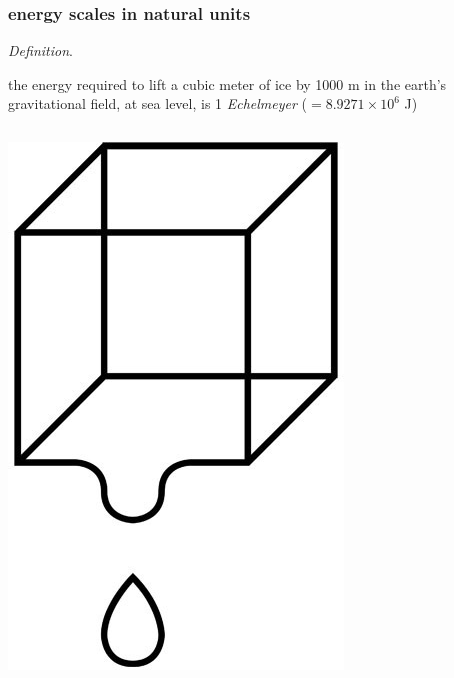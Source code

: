 \documentclass{beamer}
\begin{document}

\begin{frame}
  \frametitle{energy scales in natural units}

\emph{Definition}. 

\quad \begin{minipage}[t]{8cm} the energy required to lift a cubic meter of ice by 1000 m in the earth's gravitational field, at sea level, is 1 \emph{Echelmeyer} \quad \small ($= 8.9271 \times 10^6$ J)\normalsize \end{minipage}

\begin{columns}
\begin{column}{0.2\textwidth}
  \begin{center}
    \includegraphics[width=\textwidth]{cube-drip.jpg}

\end{center}
\end{column}
\end{columns}
\end{frame}
\end{document}
